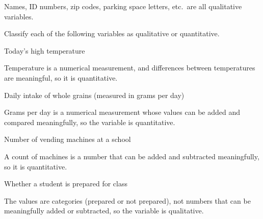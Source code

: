 \documentclass{ximera}
\begin{document}
Names, ID numbers, zip codes, parking space letters, etc.\ are all qualitative variables.

\begin{problem}
Classify each of the following variables as qualitative or quantitative.

\begin{question}
Today's high temperature
\begin{multipleChoice}
\end{multipleChoice}
\begin{explanation}
Temperature is a numerical measurement, and differences between temperatures are meaningful, so it is quantitative.
\end{explanation}
\end{question}

\begin{question}
Daily intake of whole grains (measured in grams per day)
\begin{multipleChoice}
\end{multipleChoice}
\begin{explanation}
Grams per day is a numerical measurement whose values can be added and compared meaningfully, so the variable is quantitative.
\end{explanation}
\end{question}

\begin{question}
Number of vending machines at a school
\begin{multipleChoice}
\end{multipleChoice}
\begin{explanation}
A count of machines is a number that can be added and subtracted meaningfully, so it is quantitative.
\end{explanation}
\end{question}

\begin{question}
Whether a student is prepared for class
\begin{multipleChoice}
\end{multipleChoice}
\begin{explanation}
The values are categories (prepared or not prepared), not numbers that can be meaningfully added or subtracted, so the variable is qualitative.
\end{explanation}
\end{question}


\end{problem}
\end{document}
